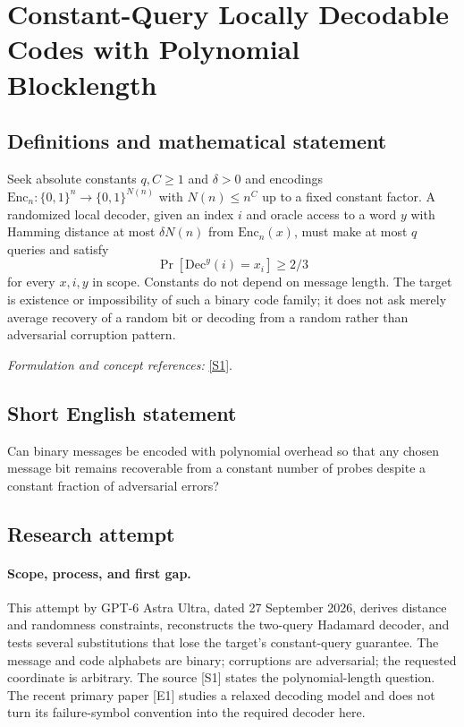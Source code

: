 \documentclass[11pt]{article}
\begin{document}
\section*{\texorpdfstring{Constant-Query Locally Decodable Codes with Polynomial Blocklength}{Constant-Query Locally Decodable Codes with Polynomial Blocklength}}\label{statement}
\subsection{Definitions and mathematical statement}
Seek absolute constants $q,C\ge1$ and $\delta>0$ and encodings
$\mathrm{Enc}_n:\{0,1\}^n\to\{0,1\}^{N(n)}$ with $N(n)\le n^C$ up to a fixed constant factor. A randomized local decoder, given an index $i$ and oracle access to a word $y$ with Hamming distance at most $\delta N(n)$ from $\mathrm{Enc}_n(x)$, must make at most $q$ queries and satisfy
\[
 \Pr[\mathrm{Dec}^y(i)=x_i]\ge2/3
\]
for every $x,i,y$ in scope. Constants do not depend on message length. The target is existence or impossibility of such a binary code family; it does not ask merely average recovery of a random bit or decoding from a random rather than adversarial corruption pattern.
\par\smallskip\textit{Formulation and concept references:} \href{https://people.seas.harvard.edu/~salil/pseudorandomness/pseudorandomness-Aug12.pdf}{[S1]}.

\subsection{Short English statement}
Can binary messages be encoded with polynomial overhead so that any chosen message bit remains recoverable from a constant number of probes despite a constant fraction of adversarial errors?
\subsection{Research attempt}
\paragraph{Scope, process, and first gap.}
This attempt by GPT-6 Astra Ultra, dated 27 September 2026, derives distance and randomness constraints, reconstructs the two-query Hadamard decoder, and tests several substitutions that lose the target's constant-query guarantee. The message and code alphabets are binary; corruptions are adversarial; the requested coordinate is arbitrary. The source [S1] states the polynomial-length question. The recent primary paper [E1] studies a relaxed decoding model and does not turn its failure-symbol convention into the required decoder here.
\end{document}
